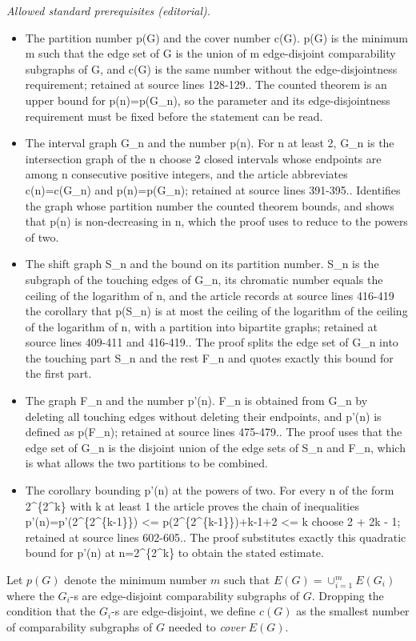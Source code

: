 \documentclass[12pt]{article}
\begin{document}
\noindent\textit{Allowed standard prerequisites (editorial).}\begin{itemize}
\item The partition number p(G) and the cover number c(G). p(G) is the minimum m such that the edge set of G is the union of m edge-disjoint comparability subgraphs of G, and c(G) is the same number without the edge-disjointness requirement; retained at source lines 128-129.. The counted theorem is an upper bound for p(n)=p(G\_n), so the parameter and its edge-disjointness requirement must be fixed before the statement can be read.
\item The interval graph G\_n and the number p(n). For n at least 2, G\_n is the intersection graph of the n choose 2 closed intervals whose endpoints are among n consecutive positive integers, and the article abbreviates c(n)=c(G\_n) and p(n)=p(G\_n); retained at source lines 391-395.. Identifies the graph whose partition number the counted theorem bounds, and shows that p(n) is non-decreasing in n, which the proof uses to reduce to the powers of two.
\item The shift graph S\_n and the bound on its partition number. S\_n is the subgraph of the touching edges of G\_n, its chromatic number equals the ceiling of the logarithm of n, and the article records at source lines 416-419 the corollary that p(S\_n) is at most the ceiling of the logarithm of the ceiling of the logarithm of n, with a partition into bipartite graphs; retained at source lines 409-411 and 416-419.. The proof splits the edge set of G\_n into the touching part S\_n and the rest F\_n and quotes exactly this bound for the first part.
\item The graph F\_n and the number p'(n). F\_n is obtained from G\_n by deleting all touching edges without deleting their endpoints, and p'(n) is defined as p(F\_n); retained at source lines 475-479.. The proof uses that the edge set of G\_n is the disjoint union of the edge sets of S\_n and F\_n, which is what allows the two partitions to be combined.
\item The corollary bounding p'(n) at the powers of two. For every n of the form 2\textasciicircum{}\{2\textasciicircum{}k\} with k at least 1 the article proves the chain of inequalities p'(n)=p'(2\textasciicircum{}\{2\textasciicircum{}\{k-1\}\}) <= p(2\textasciicircum{}\{2\textasciicircum{}\{k-1\}\})+k-1+2 <= k choose 2 + 2k - 1; retained at source lines 602-605.. The proof substitutes exactly this quadratic bound for p'(n) at n=2\textasciicircum{}\{2\textasciicircum{}k\} to obtain the stated estimate.
\end{itemize}\medskip
Let $p(G)$ denote the minimum number $m$ such that $E(G)=\cup_{i=1}^m E(G_i)$ where the $G_i$-s are edge-disjoint comparability subgraphs of $G$.
Dropping  the condition that the $G_i$-s are edge-disjoint, we define $c(G)$ as the smallest number of comparability subgraphs of $G$ needed to {\em cover} $E(G)$.
\end{document}
